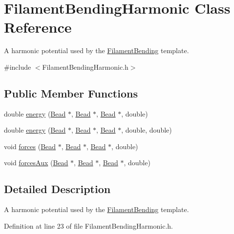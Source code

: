 \hypertarget{classFilamentBendingHarmonic}{\section{Filament\+Bending\+Harmonic Class Reference}
\label{classFilamentBendingHarmonic}
}


A harmonic potential used by the \hyperlink{classFilamentBending}{Filament\+Bending} template.  




{\ttfamily \#include $<$Filament\+Bending\+Harmonic.\+h$>$}

\subsection*{Public Member Functions}
\begin{DoxyCompactItemize}
\item 
double \hyperlink{classFilamentBendingHarmonic_a921e22634cee2f3c13ad712a554ae303}{energy} (\hyperlink{classBead}{Bead} $\ast$, \hyperlink{classBead}{Bead} $\ast$, \hyperlink{classBead}{Bead} $\ast$, double)
\item 
double \hyperlink{classFilamentBendingHarmonic_a57afd4a1c218a8bc5462d50e4c8fb9af}{energy} (\hyperlink{classBead}{Bead} $\ast$, \hyperlink{classBead}{Bead} $\ast$, \hyperlink{classBead}{Bead} $\ast$, double, double)
\item 
void \hyperlink{classFilamentBendingHarmonic_ab450b1bd28774a79f45473c66b5002a4}{forces} (\hyperlink{classBead}{Bead} $\ast$, \hyperlink{classBead}{Bead} $\ast$, \hyperlink{classBead}{Bead} $\ast$, double)
\item 
void \hyperlink{classFilamentBendingHarmonic_a4b995a97248688079326f4128b1d63bb}{forces\+Aux} (\hyperlink{classBead}{Bead} $\ast$, \hyperlink{classBead}{Bead} $\ast$, \hyperlink{classBead}{Bead} $\ast$, double)
\end{DoxyCompactItemize}


\subsection{Detailed Description}
A harmonic potential used by the \hyperlink{classFilamentBending}{Filament\+Bending} template. 

Definition at line 23 of file Filament\+Bending\+Harmonic.\+h.



